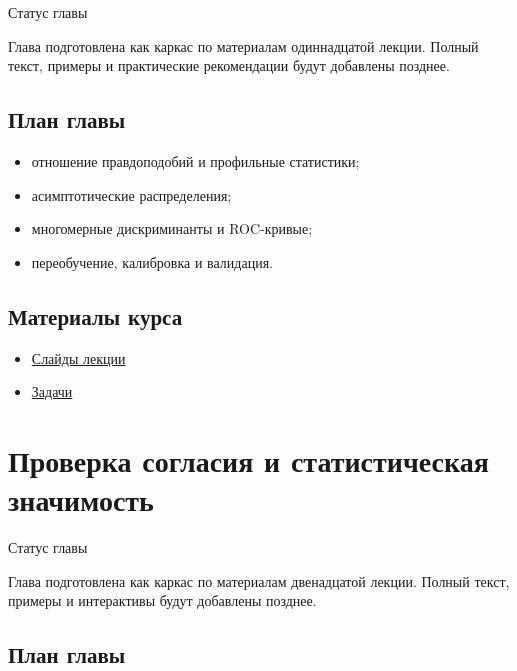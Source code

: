 \documentclass[
  russian,
  letterpaper,
]{scrbook}
\providecommand{\tightlist}{%
  \setlength{\itemsep}{0pt}\setlength{\parskip}{0pt}}
\begin{document}
{Статус главы}

Глава подготовлена как каркас по материалам одиннадцатой лекции. Полный
текст, примеры и практические рекомендации будут добавлены позднее.

\section{План
главы}\label{ux43fux43bux430ux43d-ux433ux43bux430ux432ux44b-9}

\begin{itemize}
\tightlist
\item
  отношение правдоподобий и профильные статистики;
\item
  асимптотические распределения;
\item
  многомерные дискриминанты и ROC-кривые;
\item
  переобучение, калибровка и валидация.
\end{itemize}

\section{Материалы
курса}\label{ux43cux430ux442ux435ux440ux438ux430ux43bux44b-ux43aux443ux440ux441ux430-8}

\begin{itemize}
\tightlist
\item
  \href{https://neutrinohit.github.io/statistical-analysis-course/ru/slides/10_test_statistics_and_multivariate_methods.html}{Слайды
  лекции}
\item
  \href{https://neutrinohit.github.io/statistical-analysis-course/ru/slides/exercises/10_test_statistics_and_multivariate_methods_exercises.html}{Задачи}
\end{itemize}

\chapter{Проверка согласия и статистическая
значимость}\label{ux43fux440ux43eux432ux435ux440ux43aux430-ux441ux43eux433ux43bux430ux441ux438ux44f-ux438-ux441ux442ux430ux442ux438ux441ux442ux438ux447ux435ux441ux43aux430ux44f-ux437ux43dux430ux447ux438ux43cux43eux441ux442ux44c}

{Статус главы}

Глава подготовлена как каркас по материалам двенадцатой лекции. Полный
текст, примеры и интерактивы будут добавлены позднее.

\section{План
главы}\label{ux43fux43bux430ux43d-ux433ux43bux430ux432ux44b-10}
\end{document}
